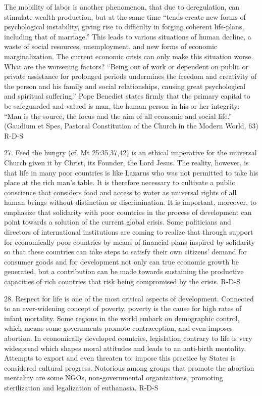 \documentclass[oneside]{book}
\begin{document}
The mobility of labor is another phenomenon, that due to deregulation, can
stimulate wealth production, but at the same time ``tends create new forms of
psychological instability, giving rise to difficulty in forging coherent
life-plans, including that of marriage.'' This leads to various situations of
human decline, a waste of social resources, unemployment, and new forms of
economic marginalization. The current economic crisis can only make this
situation worse. What are the worsening factors? ``Being out of work or
dependent on public or private assistance for prolonged periods undermines the
freedom and creativity of the person and his family and social relationships,
causing great psychological and spiritual suffering.'' Pope Benedict states
firmly that the primary capital to be safeguarded and valued is man, the human
person in his or her integrity: ``Man is the source, the focus and the aim of
all economic and social life.'' (Gaudium et Spes, Pastoral Constitution of the
Church in the Modern World, 63)
R-D-S

27. Feed the hungry (cf. Mt 25:35,37,42) is an ethical imperative for the
universal Church given it by Christ, its Founder, the Lord Jesus. The reality,
however, is that life in many poor countries is like Lazarus who was not
permitted to take his place at the rich man's table. It is therefore necessary
to cultivate a public conscience that considers food and access to water as
universal rights of all human beings without distinction or discrimination. It
is important, moreover, to emphasize that solidarity with poor countries in the
process of development can point towards a solution of the current global
crisis. Some politicians and directors of international institutions are coming
to realize that through support for economically poor countries by means of
financial plans inspired by solidarity  so that these countries can take steps
to satisfy their own citizens' demand for consumer goods and for development
not only can true economic growth be generated, but a contribution can be made
towards sustaining the productive capacities of rich countries that risk being
compromised by the crisis.
R-D-S

28. Respect for life is one of the most critical aspects of
development. Connected to an ever-widening concept of poverty, poverty is the
cause for high rates of infant mortality. Some regions in the world embark on
demographic control, which means some governments promote contraception, and
even imposes abortion. In economically developed countries, legislation contrary
to life is very widespread which shapes moral attitudes and leads to an
anti-birth mentality. Attempts to export and even threaten to; impose this
practice by States is considered cultural progress. Notorious among groups that
promote the abortion mentality are some NGOs, non-governmental organizations,
promoting sterilization and legalization of euthanasia.
R-D-S
\end{document}

